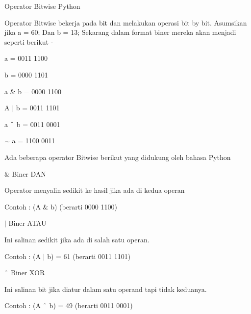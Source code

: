 \noindent 
\vspace{12pt}
\noindent 
Operator Bitwise Python \par
\vspace{12pt}
\noindent 
Operator Bitwise bekerja pada bit dan melakukan operasi bit by bit. $  $Asumsikan jika a = 60; $  $Dan b = 13; $  $Sekarang dalam format biner mereka akan menjadi seperti berikut - \par
\vspace{12pt}
\noindent 
a = 0011 1100 \par
\vspace{12pt}
\noindent 
b = 0000 1101 \par
\vspace{12pt}
\vspace{12pt}
\noindent 
a  $  \&  $ b = 0000 1100 \par
\vspace{12pt}
\noindent 
A  $  \vert  $ b = 0011 1101 \par
\vspace{12pt}
\noindent 
a  $  \string^  $ b = 0011 0001 \par
\vspace{12pt}
\noindent 
 $  \sim  $ a = 1100 0011 \par
\vspace{12pt}
\noindent 
Ada beberapa operator Bitwise berikut yang didukung oleh bahasa Python \par
\vspace{12pt}
\noindent 
 $  \&  $ Biner DAN \par
\noindent 
Operator menyalin sedikit ke hasil jika ada di kedua operan \par
\noindent 
Contoh : (A  $  \&  $ b) (berarti 0000 1100) \par
\vspace{12pt}
\noindent 
 $  \vert  $ $  $Biner ATAU \par
\noindent 
Ini salinan sedikit jika ada di salah satu operan. \par
\noindent 
Contoh : (A  $  \vert  $ b) = 61 (berarti 0011 1101) \par
\vspace{12pt}
\noindent 
 $  \string^  $ Biner XOR \par
\noindent 
Ini salinan bit jika diatur dalam satu operand tapi tidak keduanya. \par
\noindent 
Contoh : (A  $  \string^  $ b) = 49 (berarti 0011 0001) \par
\vspace{12pt}
\noindent 
